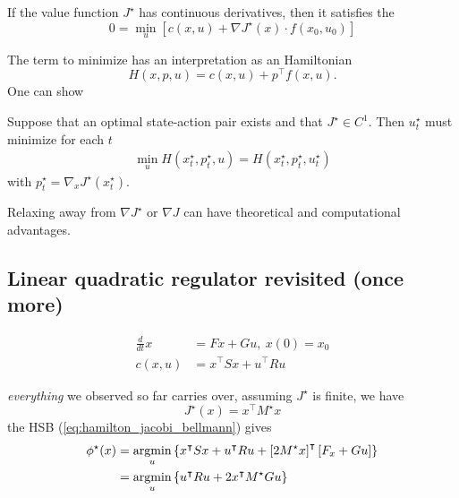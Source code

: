 \begin{theorem}\label{thm:1.23}
    If the value function \(J^\star\) has continuous derivatives, then it 
    satisfies the 
    \begin{equation}\label{eq:hamilton_jacobi_bellmann}
        0=\min_{u}\left[c(x,u)+\nabla J^\star(x)\cdot f(x_0,u_0)\right]
    \end{equation}
\end{theorem}

The term to minimize  has an interpretation 
as an Hamiltonian 
\[H(x,p,u)=c(x,u)+p^\intercal f(x,u).\]
One can show 
\begin{theorem}\label{thm:1.24}
    Suppose that an optimal state-action pair exists 
    and that \(J^\star\in C^1\). Then \(u_t^\star\) must minimize
    for each \(t\) 
    \begin{align*}
        \min_u H(x_t^\star,p_t^\star,u)=H(x_t^\star,p_t^\star,u_t^\star)
    \end{align*}
    with \(p_t^\star=\nabla_x J^\star(x_t^\star)\).
\end{theorem}
\begin{remark}
    Relaxing away from \(\nabla J^\star\) or \(\nabla J\) can have 
    theoretical and computational advantages.
\end{remark}

\subsection{Linear quadratic regulator revisited (once more)}

\begin{align*}
    \frac{d}{dt}x&=Fx+Gu,\ x(0)=x_0\\
    c(x,u)&=x^\intercal S x + u^\intercal R u 
\end{align*}

\textit{everything} we observed so far carries over, assuming \(J^\star\) is finite, we 
have 
\[J^\star(x)=x^\intercal M^\star x\]
the HSB (\ref{eq:hamilton_jacobi_bellmann}) gives 
\begin{align*}
    \phi^\star(x)&=\operatorname*{\text{argmin}}_u \left\{x^\intercal S x+ u^\intercal R u+ \left[2 M^\star x\right]^\intercal \left[F_x+ Gu\right] \right\}\\
    &=\operatorname*{\text{argmin}}_u \left\{u^\intercal R u+2 x^\intercal M^\star Gu \right\}
\end{align*}

